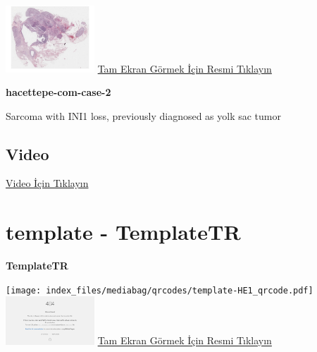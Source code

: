 \documentclass[
  letterpaper,
  DIV=11,
  numbers=noendperiod]{scrreprt}
\begin{document}
\href{https://images.patolojiatlasi.com/hacettepe-com-case-2/HE.html}{\includegraphics[width=0.25\textwidth,height=\textheight]{./screenshots/thumbnail_hacettepe-com-case-2.png}}
\href{https://images.patolojiatlasi.com/hacettepe-com-case-2/HE.html}{Tam
Ekran Görmek İçin Resmi Tıklayın}

\textbf{hacettepe-com-case-2}

\begin{tcolorbox}[enhanced jigsaw, breakable, opacitybacktitle=0.6, arc=.35mm, colbacktitle=quarto-callout-tip-color!10!white, colback=white, toptitle=1mm, left=2mm, opacityback=0, colframe=quarto-callout-tip-color-frame, titlerule=0mm, rightrule=.15mm, bottomrule=.15mm, toprule=.15mm, bottomtitle=1mm, title=\textcolor{quarto-callout-tip-color}{\faLightbulb}\hspace{0.5em}{Tanı}, coltitle=black, leftrule=.75mm]

Sarcoma with INI1 loss, previously diagnosed as yolk sac tumor

\end{tcolorbox}

\hypertarget{video-2}{%
\subsection{Video}\label{video-2}}

\href{https://www.youtube.com/watch?v=xHQihI19L5g}{Video İçin Tıklayın}

\hypertarget{sec-template}{%
\section{template - TemplateTR}\label{sec-template}}

\textbf{TemplateTR}

\texttt{[image: index\_files/mediabag/qrcodes/template-HE1\_qrcode.pdf]}
\href{https://images.patolojiatlasi.com/template/HE1.html}{\includegraphics[width=0.25\textwidth,height=\textheight]{./screenshots/thumbnail_template-HE1.png}}
\href{https://images.patolojiatlasi.com/template/HE1.html}{Tam Ekran
Görmek İçin Resmi Tıklayın}
\end{document}
